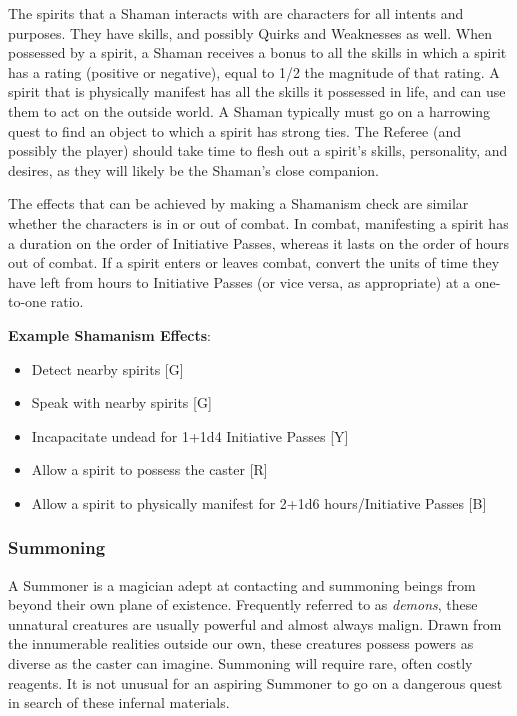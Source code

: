 \documentclass[oneside]{book}
\begin{document}
\begin{multicols}{2}
The spirits that a Shaman interacts with are characters for all intents and purposes. They have skills, and possibly Quirks and Weaknesses as well. When possessed by a spirit, a Shaman receives a bonus to all the skills in which a spirit has a rating (positive or negative), equal to 1/2 the magnitude of that rating. A spirit that is physically manifest has all the skills it possessed in life, and can use them to act on the outside world. A Shaman typically must go on a harrowing quest to find an object to which a spirit has strong ties. The Referee (and possibly the player) should take time to flesh out a spirit's skills, personality, and desires, as they will likely be the Shaman's close companion.

The effects that can be achieved by making a Shamanism check are similar whether the characters is in or out of combat. In combat, manifesting a spirit has a duration on the order of Initiative Passes, whereas it lasts on the order of hours out of combat. If a spirit enters or leaves combat, convert the units of time they have left from hours to Initiative Passes (or vice versa, as appropriate) at a one-to-one ratio. 

\textbf{Example Shamanism Effects}: 
	\begin{itemize}
		\setlength{\itemsep}{0cm}%
  		\setlength{\parskip}{0cm}%
		\item{ \small Detect nearby spirits [G]}
		\item{ \small Speak with nearby spirits [G]}
		\item{ \small Incapacitate undead for 1+1d4 Initiative Passes [Y]}
		\item{ \small Allow a spirit to possess the caster [R]}
		\item{ \small Allow a spirit to physically manifest for 2+1d6 hours/Initiative Passes [B]}
	\end{itemize}

\subsubsection{Summoning}
A Summoner is a magician adept at contacting and summoning beings from beyond their own plane of existence. Frequently referred to as \emph{demons}, these unnatural creatures are usually powerful and almost always malign. Drawn from the innumerable realities outside our own, these creatures possess powers as diverse as the caster can imagine. Summoning will require rare, often costly reagents. It is not unusual for an aspiring Summoner to go on a dangerous quest in search of these infernal materials.


\end{multicols}
\end{document}

